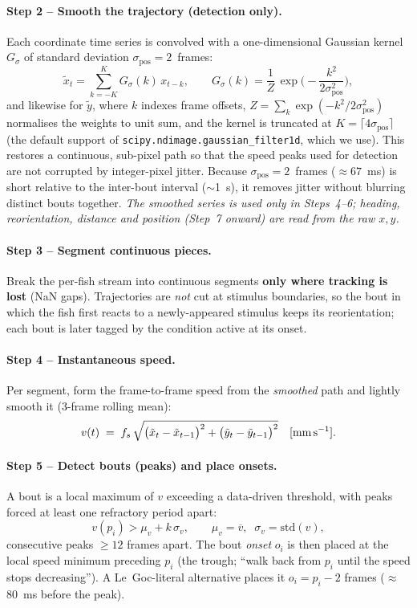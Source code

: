 \documentclass{article}
\begin{document}
\paragraph{Step 2 -- Smooth the trajectory (detection only).}
Each coordinate time series is convolved with a one-dimensional Gaussian kernel
$G_\sigma$ of standard deviation $\sigma_{\text{pos}}=2$~frames:
\[
\tilde x_t = \sum_{k=-K}^{K} G_\sigma(k)\, x_{t-k},
\qquad
G_\sigma(k) = \frac{1}{Z}\,\exp\!\Big(-\frac{k^2}{2\sigma_{\text{pos}}^2}\Big),
\]
and likewise for $\tilde y$, where $k$ indexes frame offsets, $Z=\sum_k
\exp(-k^2/2\sigma_{\text{pos}}^2)$ normalises the weights to unit sum, and the
kernel is truncated at $K=\lceil 4\sigma_{\text{pos}}\rceil$ (the default support
of \texttt{scipy.ndimage.gaussian\_filter1d}, which we use). This restores a
continuous, sub-pixel path so that the speed peaks used for detection are not
corrupted by integer-pixel jitter. Because $\sigma_{\text{pos}}=2$~frames
($\approx67$~ms) is short relative to the inter-bout interval ($\sim$1~s), it
removes jitter without blurring distinct bouts together. \emph{The smoothed
series is used only in Steps~4--6; heading, reorientation, distance and position
(Step~7 onward) are read from the raw $x,y$.}

\paragraph{Step 3 -- Segment continuous pieces.}
Break the per-fish stream into continuous segments \textbf{only where tracking is
lost} (NaN gaps). Trajectories are \emph{not} cut at stimulus boundaries, so the
bout in which the fish first reacts to a newly-appeared stimulus keeps its
reorientation; each bout is later tagged by the condition active at its onset.

\paragraph{Step 4 -- Instantaneous speed.}
Per segment, form the frame-to-frame speed from the \emph{smoothed} path and
lightly smooth it (3-frame rolling mean):
\[
v(t) \;=\; f_s\,\sqrt{\big(\tilde x_{t}-\tilde x_{t-1}\big)^2
                      +\big(\tilde y_{t}-\tilde y_{t-1}\big)^2}\quad[\text{mm\,s}^{-1}].
\]

\paragraph{Step 5 -- Detect bouts (peaks) and place onsets.}
A bout is a local maximum of $v$ exceeding a data-driven threshold, with peaks
forced at least one refractory period apart:
\[
v(p_i) > \mu_v + k\,\sigma_v ,\qquad
\mu_v=\overline{v},\;\; \sigma_v=\mathrm{std}(v),
\]
consecutive peaks $\ge 12$ frames apart. The bout \emph{onset} $o_i$ is then
placed at the local speed minimum preceding $p_i$ (the trough; ``walk back from
$p_i$ until the speed stops decreasing''). A Le~Goc-literal alternative places it
$o_i = p_i - 2$ frames ($\approx$80~ms before the peak).
\end{document}
